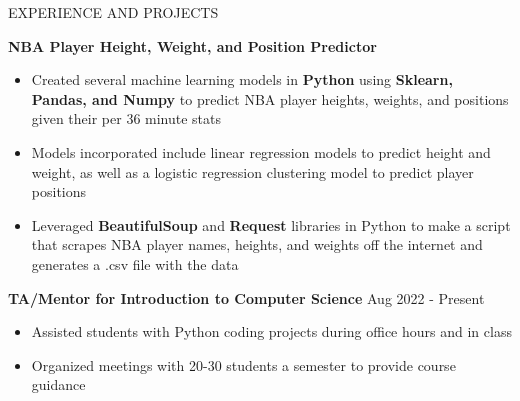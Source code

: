 \documentclass{resume} %
\begin{document}
\begin{rSection}{EXPERIENCE AND PROJECTS}

%
%



\item \textbf{NBA Player Height, Weight, and Position Predictor} %
\vspace{-6pt}
 \begin{itemize}
    \itemsep -6pt {} 
     \item Created several machine learning models in \textbf{Python} using \textbf{Sklearn, Pandas, and Numpy} to predict NBA player heights, weights, and positions given their per 36 minute stats
     \item Models incorporated include linear regression models to predict height and weight, as well as a logistic regression clustering model to predict player positions
    \item Leveraged \textbf{BeautifulSoup} and \textbf{Request} libraries in Python to make a script that scrapes NBA player names, heights, and weights off the internet and generates a .csv file with the data
 \end{itemize}



 \textbf{TA/Mentor for Introduction to Computer Science} \hfill Aug 2022 - Present%
\vspace{-6pt}
 \begin{itemize}
    \itemsep -6pt {} 
     \item Assisted students with Python coding projects during office hours and in class
     \item Organized meetings with 20-30 students a semester to provide course guidance
 \end{itemize}
 

\end{rSection}
\end{document}
